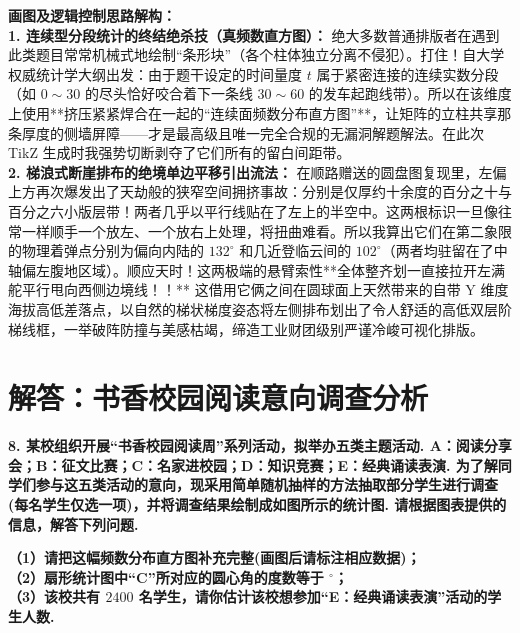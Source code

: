 {\small\color{blue!70!black}
\textbf{画图及逻辑控制思路解构：}\\
\textbf{1. 连续型分段统计的终结绝杀技（真频数直方图）：} 绝大多数普通排版者在遇到此类题目常常机械式地绘制“条形块”（各个柱体独立分离不侵犯）。打住！自大学权威统计学大纲出发：由于题干设定的时间量度 $t$ 属于紧密连接的连续实数分段（如 $0{\sim}30$ 的尽头恰好咬合着下一条线 $30{\sim}60$ 的发车起跑线带）。所以在该维度上使用**挤压紧紧焊合在一起的“连续面频数分布直方图”**，让矩阵的立柱共享那条厚度的侧墙屏障——才是最高级且唯一完全合规的无漏洞解题解法。在此次 TikZ 生成时我强势切断剥夺了它们所有的留白间距带。\\
\textbf{2. 梯浪式断崖排布的绝境单边平移引出流法：} 在顺路赠送的圆盘图复现里，左偏上方再次爆发出了天劫般的狭窄空间拥挤事故：分别是仅厚约十余度的百分之十与百分之六小版层带！两者几乎以平行线贴在了左上的半空中。这两根标识一旦像往常一样顺手一个放左、一个放右上处理，将扭曲难看。所以我算出它们在第二象限的物理着弹点分别为偏向内陆的 $132^\circ$ 和几近登临云间的 $102^\circ$（两者均驻留在了中轴偏左腹地区域）。顺应天时！这两极端的悬臂索性**全体整齐划一直接拉开左满舵平行甩向西侧边境线！！** 这借用它俩之间在圆球面上天然带来的自带 Y 维度海拔高低差落点，以自然的梯状梯度姿态将左侧排布划出了令人舒适的高低双层阶梯线框，一举破阵防撞与美感枯竭，缔造工业财团级别严谨冷峻可视化排版。
}



\newpage



\section{解答：书香校园阅读意向调查分析}

\vspace{0.6cm}

\textbf{8. 某校组织开展“书香校园阅读周”系列活动，拟举办五类主题活动. A：阅读分享会；B：征文比赛；C：名家进校园；D：知识竞赛；E：经典诵读表演. 为了解同学们参与这五类活动的意向，现采用简单随机抽样的方法抽取部分学生进行调查(每名学生仅选一项)，并将调查结果绘制成如图所示的统计图. 请根据图表提供的信息，解答下列问题.}

\vspace{0.4cm}

\textbf{（1）请把这幅频数分布直方图补充完整(画图后请标注相应数据)；\\
（2）扇形统计图中“C”所对应的圆心角的度数等于 \underline{\makebox[1.5cm]{}}$^\circ$；\\
（3）该校共有 $2400$ 名学生，请你估计该校想参加“E：经典诵读表演”活动的学生人数.}

